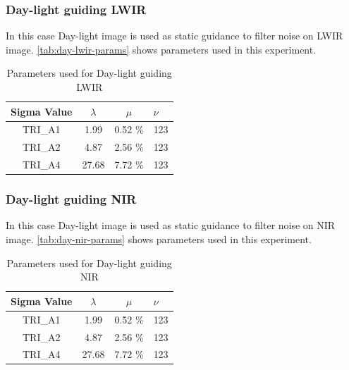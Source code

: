 \documentclass[10pt,twocolumn,letterpaper]{article}
\begin{document}
\subsubsection{Day-light guiding LWIR}
In this case Day-light image is used as static guidance to filter noise on LWIR image. \autoref{tab:day-lwir-params} shows parameters used in this experiment.
\begin{table}[!ht]
	\centering
	\caption{Parameters used for Day-light guiding LWIR}
	\label{tab:day-lwir-params}
	\begin{tabular}{@{}cccl@{}}
		\toprule
		\bfseries Sigma Value & \(\lambda\) & \(\mu\) & \(\nu\) \\ \midrule
		TRI\_A1               & 1.99        & 0.52 \% & 123       \\
		TRI\_A2               & 4.87        & 2.56 \% & 123        \\
		TRI\_A4               & 27.68       & 7.72 \% & 123        \\ \bottomrule
	\end{tabular}
\end{table}
\subsubsection{Day-light guiding NIR}
In this case Day-light image is used as static guidance to filter noise on NIR image. \autoref{tab:day-nir-params} shows parameters used in this experiment.
\begin{table}[!ht]
	\centering
	\caption{Parameters used for Day-light guiding NIR}
	\label{tab:day-nir-params}
	\begin{tabular}{@{}cccl@{}}
		\toprule
		\bfseries Sigma Value & \(\lambda\) & \(\mu\) & \(\nu\) \\ \midrule
		TRI\_A1               & 1.99        & 0.52 \% & 123       \\
		TRI\_A2               & 4.87        & 2.56 \% & 123        \\
		TRI\_A4               & 27.68       & 7.72 \% & 123        \\ \bottomrule
	\end{tabular}
\end{table}
{\small


}
\end{document}
